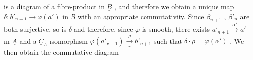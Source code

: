 is a diagram of a fibre-product in $\underline{B}$ , and therefore we obtain a unique map $\delta : b'_{n+1} \to \varphi(a')$ in $\underline{B}$ with an appropriate commutativity. Since $\beta_{n+1}$ , $\beta'_n$ are both surjective, so is $\delta$ and therefore, since $\varphi$ is smooth, there exists $a'_{n+1} \xrightarrow{\ \alpha'\ } a'$ in $\underline{A}$ and a $\underline{C}_{\Lambda}$-isomorphism $\varphi(a'_{n+1}) \xrightarrow[\sim]{\rho} b'_{n+1}$ such that $\delta \cdot \rho = \varphi(\alpha')$ . We then obtain the commutative diagram

